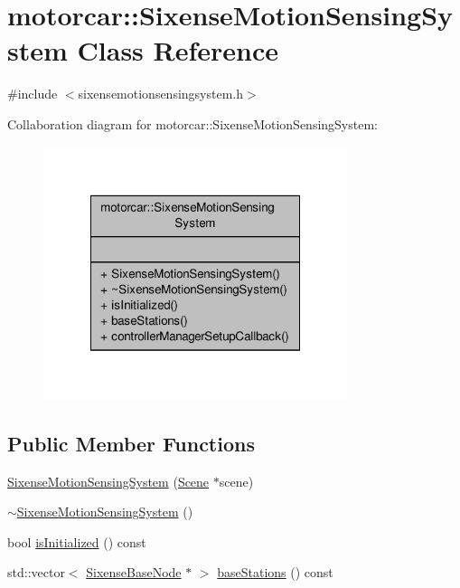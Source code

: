 \hypertarget{classmotorcar_1_1SixenseMotionSensingSystem}{\section{motorcar\-:\-:Sixense\-Motion\-Sensing\-System Class Reference}
\label{classmotorcar_1_1SixenseMotionSensingSystem}
}


{\ttfamily \#include $<$sixensemotionsensingsystem.\-h$>$}



Collaboration diagram for motorcar\-:\-:Sixense\-Motion\-Sensing\-System\-:
\nopagebreak
\begin{figure}[H]
\begin{center}
\leavevmode
\includegraphics[width=252pt]{classmotorcar_1_1SixenseMotionSensingSystem__coll__graph}
\end{center}
\end{figure}
\subsection*{Public Member Functions}
\begin{DoxyCompactItemize}
\item 
\hyperlink{classmotorcar_1_1SixenseMotionSensingSystem_a36e5d5612aabed32df976c19cfacec2d}{Sixense\-Motion\-Sensing\-System} (\hyperlink{classmotorcar_1_1Scene}{Scene} $\ast$scene)
\item 
\hyperlink{classmotorcar_1_1SixenseMotionSensingSystem_aa9d2334b2f0e2912e719e538a051f952}{$\sim$\-Sixense\-Motion\-Sensing\-System} ()
\item 
bool \hyperlink{classmotorcar_1_1SixenseMotionSensingSystem_ac58c619e72581bc1d268851f4349c07a}{is\-Initialized} () const 
\item 
std\-::vector$<$ \hyperlink{classmotorcar_1_1SixenseBaseNode}{Sixense\-Base\-Node} $\ast$ $>$ \hyperlink{classmotorcar_1_1SixenseMotionSensingSystem_ac5ed9086cca91cd68b4b038505419bd2}{base\-Stations} () const 
\end{DoxyCompactItemize}
